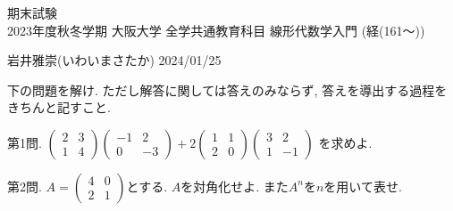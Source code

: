 \documentclass[dvipdfmx,a4paper,11pt]{article}
\theoremstyle{definition}
\begin{document}
\pagestyle{empty}



\begin{center}
{\LARGE 期末試験} \\

{2023年度秋冬学期 大阪大学 全学共通教育科目 線形代数学入門 (経(161〜))}
\end{center}

\begin{flushright}
 岩井雅崇(いわいまさたか) 2024/01/25
\end{flushright}



  
  \begin{center}
下の問題を解け.  ただし解答に関しては答えのみならず, 答えを導出する過程をきちんと記すこと. 
  \end{center}
  
   \vspace{11pt}
{\Large 第1問.} 
\vspace{11pt}
$\begin{pmatrix}  2& 3  \\  1 &4  \end{pmatrix}
\begin{pmatrix}  -1& 2  \\  0 &-3  \end{pmatrix}
+ 
2\begin{pmatrix}  1& 1  \\  2 &0 \end{pmatrix}
\begin{pmatrix}  3& 2  \\  1&-1  \end{pmatrix}
$
 を求めよ. 
  
  
 \vspace{11pt}
{\Large 第2問.} 
\vspace{11pt}
$A=\begin{pmatrix}  4&  0 \\  2 &1  \end{pmatrix}
$とする. $A$を対角化せよ. また$A^n$を$n$を用いて表せ. 
  
\end{document}
